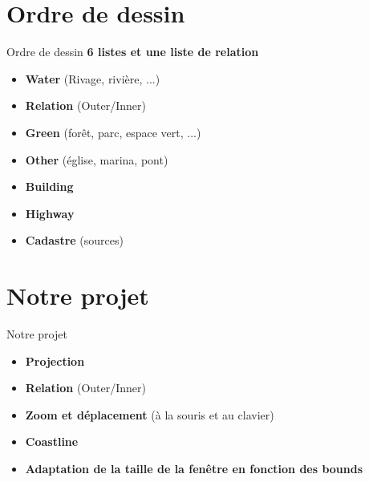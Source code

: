 \documentclass[french]{beamer}
\begin{document}
\section{Ordre de dessin}
\begin{frame}{Ordre de dessin}
	 \textbf{6 listes et une liste de relation}
	 \begin{itemize}
	 \item<2-8> \textbf{Water} (Rivage, rivière, ...)
 	 \item<3-8> \textbf{Relation} (Outer/Inner)
	 \item<4-8> \textbf{Green} (forêt, parc, espace vert, ...)
	 \item<5-8> \textbf{Other} (église, marina, pont) 
	 \item<6-8>	\textbf{Building}
	 \item<7-8> \textbf{Highway} 
	 \item<8> 	\textbf{Cadastre} (sources)

	\end{itemize}
\end{frame}

\section{Notre projet}
\begin{frame}{Notre projet}
	 \begin{itemize}
	 \item<1-5> \textbf{Projection}
 	 \item<2-5> \textbf{Relation} (Outer/Inner)
	 \item<3-5> \textbf{Zoom et déplacement} (à la souris et au clavier)
	 \item<4-5> \textbf{Coastline}
	 \item<5>	\textbf{Adaptation de la taille de la fenêtre en fonction des bounds }
	\end{itemize}
\end{frame}
\end{document}
